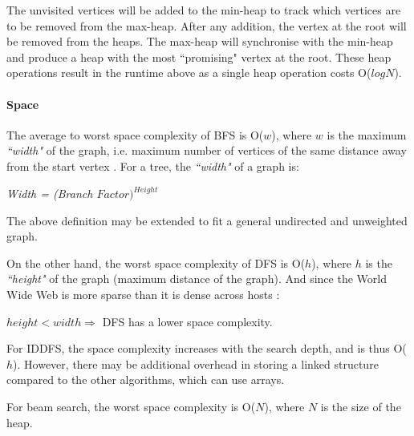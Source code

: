 \documentclass{article}
\begin{document}
The unvisited vertices will be added to the min-heap to track which vertices are to be removed from the max-heap. After any addition, the vertex at the root will be removed from the heaps. The max-heap will synchronise with the min-heap and produce a heap with the most ``promising" vertex at the root. These heap operations result in the runtime above as a single heap operation costs O($ logN $).
\newpage

\paragraph{Space}
The average to worst space complexity of BFS is O($ w $), where $ w $ is the maximum \textit{``width"} of the graph, i.e. maximum number of vertices of the same distance away from the start vertex \cite{bib-05}. For a tree, the \textit{``width"} of a graph is:
\medskip

\textit{Width = (Branch $ Factor)^{Height} $}
\medskip

The above definition may be extended to fit a general undirected and unweighted graph.
\medskip

On the other hand, the worst space complexity of DFS is O($ h $), where $ h $ is the \textit{``height"} of the graph (maximum distance of the graph). And since the World Wide Web is more sparse than it is dense across hosts \cite{bib-06}:
\medskip

$ height < width \Rightarrow $ DFS has a lower space complexity.
\medskip

For IDDFS, the space complexity increases with the search depth, and is thus O($ h $). However, there may be additional overhead in storing a linked structure compared to the other algorithms, which can use arrays.
\medskip

For beam search, the worst space complexity is O($ N $), where $ N $ is the size of the heap.

\end{document}
